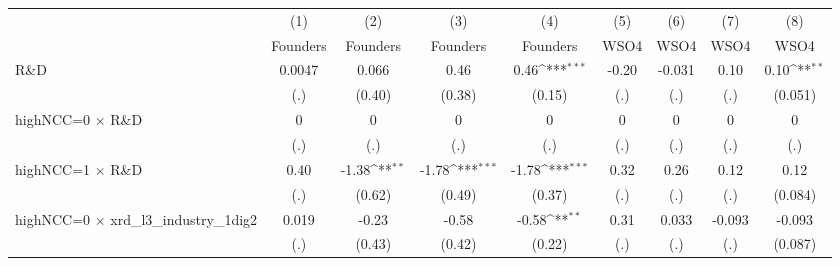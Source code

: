 {
\def\sym#1{\ifmmode^{#1}\else\(^{#1}\)\fi}
\begin{tabular}{l*{8}{c}}
\toprule
                    &\multicolumn{1}{c}{(1)}&\multicolumn{1}{c}{(2)}&\multicolumn{1}{c}{(3)}&\multicolumn{1}{c}{(4)}&\multicolumn{1}{c}{(5)}&\multicolumn{1}{c}{(6)}&\multicolumn{1}{c}{(7)}&\multicolumn{1}{c}{(8)}\\
                    &\multicolumn{1}{c}{Founders}&\multicolumn{1}{c}{Founders}&\multicolumn{1}{c}{Founders}&\multicolumn{1}{c}{Founders}&\multicolumn{1}{c}{WSO4}&\multicolumn{1}{c}{WSO4}&\multicolumn{1}{c}{WSO4}&\multicolumn{1}{c}{WSO4}\\
\midrule
R\&D                &      0.0047         &       0.066         &        0.46         &        0.46\sym{***}&       -0.20         &      -0.031         &        0.10         &        0.10\sym{**} \\
                    &         (.)         &      (0.40)         &      (0.38)         &      (0.15)         &         (.)         &         (.)         &         (.)         &     (0.051)         \\
\addlinespace
highNCC=0 $\times$ R\&D&           0         &           0         &           0         &           0         &           0         &           0         &           0         &           0         \\
                    &         (.)         &         (.)         &         (.)         &         (.)         &         (.)         &         (.)         &         (.)         &         (.)         \\
\addlinespace
highNCC=1 $\times$ R\&D&        0.40         &       -1.38\sym{**} &       -1.78\sym{***}&       -1.78\sym{***}&        0.32         &        0.26         &        0.12         &        0.12         \\
                    &         (.)         &      (0.62)         &      (0.49)         &      (0.37)         &         (.)         &         (.)         &         (.)         &     (0.084)         \\
\addlinespace
highNCC=0 $\times$ xrd\_l3\_industry\_1dig2&       0.019         &       -0.23         &       -0.58         &       -0.58\sym{**} &        0.31         &       0.033         &      -0.093         &      -0.093         \\
                    &         (.)         &      (0.43)         &      (0.42)         &      (0.22)         &         (.)         &         (.)         &         (.)         &     (0.087)         \\

\end{tabular}}
